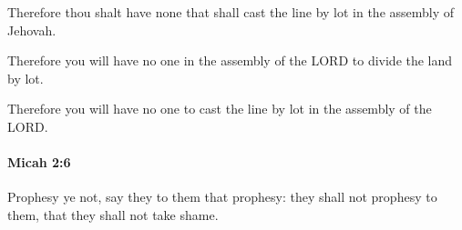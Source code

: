 			\begin{versebox}
					\item[BHS] 
					\item[LXX] 
					\item[ASV] Therefore thou shalt have none that shall cast the line by lot in the assembly of Jehovah.
					\item[NIV] Therefore you will have no one in the assembly of the LORD to divide the land by lot.
					\item[NRSV] Therefore you will have no one to cast the line by lot in the assembly of the LORD.
			\end{versebox}

		\paragraph{Micah 2:6} %
			\label{MICAH-2-6}

			Prophesy ye not, say they to them that prophesy: they shall not prophesy to them, that they shall not take shame.

